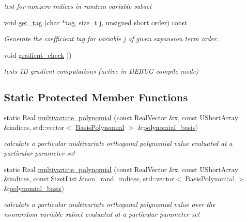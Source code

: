 \begin{DoxyCompactItemize}
\begin{DoxyCompactList}\small\item\em test for nonzero indices in random variable subset \end{DoxyCompactList}\item 
void \hyperlink{classPecos_1_1SharedOrthogPolyApproxData_aa171b2364ff0d1f957f1df15739553c4}{get\+\_\+tag} (char $\ast$tag, size\+\_\+t j, unsigned short order) const \label{classPecos_1_1SharedOrthogPolyApproxData_aa171b2364ff0d1f957f1df15739553c4}

\begin{DoxyCompactList}\small\item\em Generate the coefficient tag for variable j of given expansion term order. \end{DoxyCompactList}\item 
void \hyperlink{classPecos_1_1SharedOrthogPolyApproxData_aa8fb8d2ab861defc076706d1fabe98d4}{gradient\+\_\+check} ()
\begin{DoxyCompactList}\small\item\em tests 1D gradient computations (active in D\+E\+B\+UG compile mode) \end{DoxyCompactList}\end{DoxyCompactItemize}
\subsection*{Static Protected Member Functions}
\begin{DoxyCompactItemize}
\item 
static Real \hyperlink{classPecos_1_1SharedOrthogPolyApproxData_a81471d428f2c81abb5d7965e32bc5e80}{multivariate\+\_\+polynomial} (const Real\+Vector \&x, const U\+Short\+Array \&indices, std\+::vector$<$ \hyperlink{classPecos_1_1BasisPolynomial}{Basis\+Polynomial} $>$ \&\hyperlink{classPecos_1_1SharedOrthogPolyApproxData_a7282b8c27142b1b15cd79922c3f55e19}{polynomial\+\_\+basis})\label{classPecos_1_1SharedOrthogPolyApproxData_a81471d428f2c81abb5d7965e32bc5e80}

\begin{DoxyCompactList}\small\item\em calculate a particular multivariate orthogonal polynomial value evaluated at a particular parameter set \end{DoxyCompactList}\item 
static Real \hyperlink{classPecos_1_1SharedOrthogPolyApproxData_a9af296d5989954405a060f1506e6957d}{multivariate\+\_\+polynomial} (const Real\+Vector \&x, const U\+Short\+Array \&indices, const Sizet\+List \&non\+\_\+rand\+\_\+indices, std\+::vector$<$ \hyperlink{classPecos_1_1BasisPolynomial}{Basis\+Polynomial} $>$ \&\hyperlink{classPecos_1_1SharedOrthogPolyApproxData_a7282b8c27142b1b15cd79922c3f55e19}{polynomial\+\_\+basis})
\begin{DoxyCompactList}\small\item\em calculate a particular multivariate orthogonal polynomial value over the nonrandom variable subset evaluated at a particular parameter set \end{DoxyCompactList}\end{DoxyCompactItemize}

